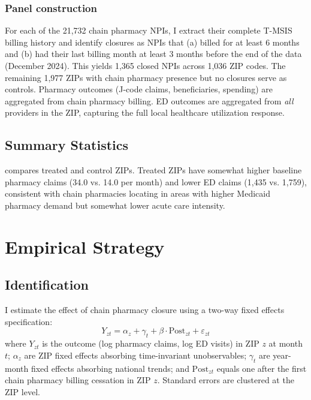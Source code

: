\documentclass[12pt]{article}
\begin{document}
\subsubsection*{Panel construction} For each of the 21,732 chain pharmacy NPIs, I extract their complete T-MSIS billing history and identify closures as NPIs that (a) billed for at least 6 months and (b) had their last billing month at least 3 months before the end of the data (December 2024). This yields 1,365 closed NPIs across 1,036 ZIP codes. The remaining 1,977 ZIPs with chain pharmacy presence but no closures serve as controls. Pharmacy outcomes (J-code claims, beneficiaries, spending) are aggregated from chain pharmacy billing. ED outcomes are aggregated from \textit{all} providers in the ZIP, capturing the full local healthcare utilization response.

\subsection{Summary Statistics}



 compares treated and control ZIPs. Treated ZIPs have somewhat higher baseline pharmacy claims (34.0 vs. 14.0 per month) and lower ED claims (1,435 vs. 1,759), consistent with chain pharmacies locating in areas with higher Medicaid pharmacy demand but somewhat lower acute care intensity.

\section{Empirical Strategy}

\subsection{Identification}

I estimate the effect of chain pharmacy closure using a two-way fixed effects specification:
\begin{equation}
Y_{zt} = \alpha_z + \gamma_t + \beta \cdot \text{Post}_{zt} + \varepsilon_{zt}
\label{eq:did}
\end{equation}
where $Y_{zt}$ is the outcome (log pharmacy claims, log ED visits) in ZIP $z$ at month $t$; $\alpha_z$ are ZIP fixed effects absorbing time-invariant unobservables; $\gamma_t$ are year-month fixed effects absorbing national trends; and $\text{Post}_{zt}$ equals one after the first chain pharmacy billing cessation in ZIP $z$. Standard errors are clustered at the ZIP level.
\end{document}
